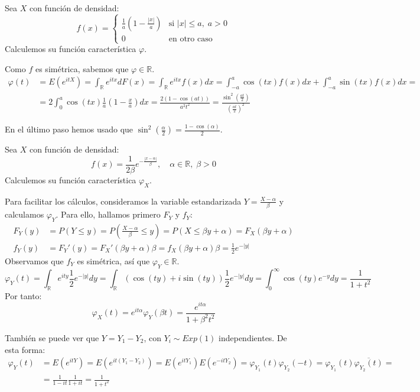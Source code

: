 \begin{exercise}
    Sea $X$ con función de densidad:
    $$f(x) = \begin{cases}
            \frac{1}{a} \left(1 - \frac{|x|}{a}\right) & \text{si } |x| \leq a, \; a > 0 \\
            0                                          & \text{en otro caso}
        \end{cases}$$
    Calculemos su función característica $\varphi$.

    Como $f$ es simétrica, sabemos que $\varphi \in \mathbb{R}$.
    \begin{align*}
        \varphi(t) & = E(e^{itX}) = \int_\mathbb{R} e^{itx}dF(x) = \int_\mathbb{R} e^{itx}f(x)dx = \int_{-a}^a \cos(tx)f(x)dx + \int_{-a}^a \sin(tx)f(x)dx =                          \\
                   & = 2\int_0^a \cos(tx)\frac{1}{a}\left(1-\frac{x}{a}\right)dx = \frac{2(1-\cos(at))}{a^2t^2} = \frac{\sin^2\left(\frac{at}{2}\right)}{\left(\frac{at}{2}\right)^2}
    \end{align*}

    En el último paso hemos usado que $\sin^2(\frac{\alpha}{2}) = \frac{1-\cos(\alpha)}{2}$.
\end{exercise}

\begin{exercise}
    Sea $X$ con función de densidad:
    $$f(x) = \frac{1}{2\beta}e^{-\frac{|x-\alpha|}{\beta}}, \quad \alpha \in \mathbb{R}, \; \beta > 0$$
    Calculemos su función característica $\varphi_X$.

    Para facilitar los cálculos, consideramos la variable estandarizada $Y = \frac{X-\alpha}{\beta}$ y calculamos $\varphi_Y$.
    Para ello, hallamos primero $F_Y$ y $f_Y$:
    \begin{align*}
        F_Y(y) & = P(Y \leq y) = P\left(\frac{X-\alpha}{\beta} \leq y\right) = P(X \leq \beta y + \alpha) = F_X(\beta y + \alpha) \\
        f_Y(y) & = F_Y'(y) = F_X'(\beta y + \alpha)\beta = f_X(\beta y + \alpha)\beta = \frac{1}{2}e^{-|y|}
    \end{align*}
    Observamos que $f_Y$ es simétrica, así que $\varphi_Y \in \mathbb{R}$.
    $$\varphi_Y(t) = \int_\mathbb{R} e^{ity}\frac{1}{2}e^{-|y|}dy = \int_\mathbb{R} (\cos(ty) + i\sin(ty))\frac{1}{2}e^{-|y|}dy = \int_0^\infty \cos(ty)e^{-y}dy = \frac{1}{1+t^2}$$
    Por tanto:
    $$\varphi_X(t) = e^{it\alpha}\varphi_Y(\beta t) = \frac{e^{it\alpha}}{1+\beta^2t^2}$$

    También se puede ver que $Y = Y_1 - Y_2$, con $Y_i \sim Exp(1)$ independientes.
    De esta forma:
    \begin{align*}
        \varphi_Y(t) & = E(e^{itY}) = E(e^{it(Y_1-Y_2)}) = E(e^{itY_1})E(e^{-itY_2}) = \varphi_{Y_1}(t)\varphi_{Y_2}(-t) = \varphi_{Y_1}(t) \overline{\varphi_{Y_2}(t)} = \\
                     & = \frac{1}{1-it}\frac{1}{1+it} = \frac{1}{1+t^2}
    \end{align*}
\end{exercise}

